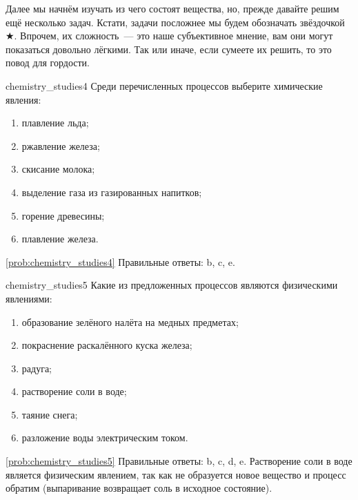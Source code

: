 Далее мы начнём изучать из чего состоят вещества, но, прежде давайте решим ещё несколько задач. Кстати, задачи посложнее мы будем обозначать звёздочкой $\bigstar$. Впрочем, их сложность~--- это наше субъективное мнение, вам они могут показаться довольно лёгкими. Так или иначе, если сумеете их решить, то это повод для гордости.

\begin{problem}{}{chemistry_studies4}
    Среди перечисленных процессов выберите химические явления:
    \begin{enumerate}[label=\alph*)]
        \item плавление льда;
        \item ржавление железа;
        \item скисание молока;
        \item выделение газа из газированных напитков;
        \item горение древесины;
        \item плавление железа.
    \end{enumerate}

    \begin{sol}{\ref{prob:chemistry_studies4}}
        Правильные ответы: b, c, e.
    \end{sol}
\end{problem}

\begin{problem}{}{chemistry_studies5}
    Какие из предложенных процессов являются физическими явлениями:
    \begin{enumerate}[label=\alph*)]
        \item образование зелёного налёта на медных предметах;
        \item покраснение раскалённого куска железа;
        \item радуга;
        \item растворение соли в воде;
        \item таяние снега;
        \item разложение воды электрическим током.
    \end{enumerate}

    \begin{sol}{\ref{prob:chemistry_studies5}}
        Правильные ответы: b, c, d, e. Растворение соли в воде является физическим явлением, так как не образуется новое вещество и процесс обратим (выпаривание возвращает соль в исходное состояние).
    \end{sol}
\end{problem}

